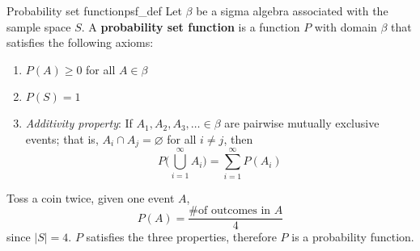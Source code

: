 \begin{Definition}{Probability set function}{psf_def}
    Let $ \beta $ be a sigma algebra associated with the sample space $ S $.
    A \textbf{probability set function} is a function $ P $
    with domain $ \beta $ that satisfies the following axioms:
    \begin{enumerate}[label=(\Roman*)]
        \item\label{psf_def_1} $ P(A)\geqslant 0 $ for all $ A\in \beta $
        \item\label{psf_def_2} $ P(S)=1 $
        \item\label{psf_def_3} \emph{Additivity property}: If $ A_1,A_2,A_3,\ldots\in \beta $
              are pairwise mutually exclusive events; that is, $ A_i\cap A_j=\varnothing $
              for all $ i\neq j $, then
              \[ P\biggl( \bigcup_{i=1}^{\infty}A_i \biggr)=\sum\limits_{i=1}^{\infty} P(A_i) \]
    \end{enumerate}
\end{Definition}

\begin{Example}{}{}
    Toss a coin twice, given one event $ A $,
    \[ P(A)=\frac{\text{\# of outcomes in }A}{4}  \]
    since $ |S|= 4 $. $ P $ satisfies the three properties,
    therefore $ P $ is a probability function.
\end{Example}

